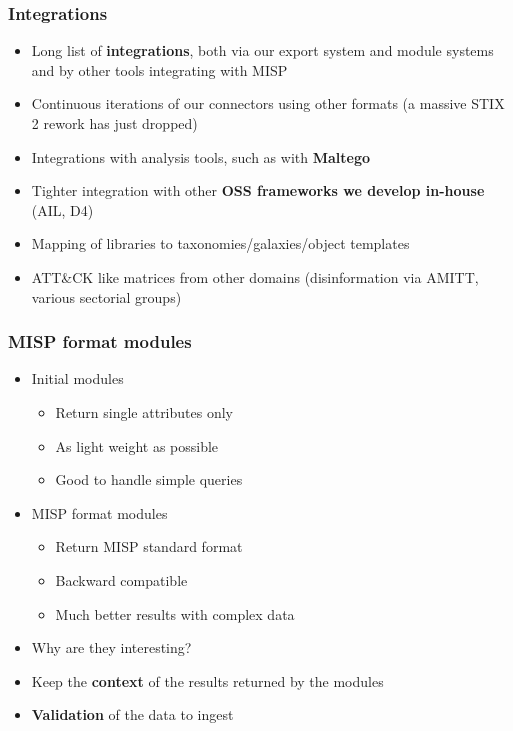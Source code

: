 \begin{frame}
\frametitle{Integrations}
\begin{itemize}
	\item Long list of {\bf integrations}, both via our export system and module systems and by other tools integrating with MISP
        \item Continuous iterations of our connectors using other formats (a massive STIX 2 rework has just dropped)
        \item Integrations with analysis tools, such as with {\bf Maltego}
        \item Tighter integration with other {\bf OSS frameworks we develop in-house} (AIL, D4)
        \item Mapping of libraries to taxonomies/galaxies/object templates
        \item ATT\&CK like matrices from other domains (disinformation via AMITT, various sectorial groups)
\end{itemize}
\end{frame}

\begin{frame}
\frametitle{MISP format modules}
\begin{itemize}
    \item Initial modules
    \begin{itemize}
        \item Return single attributes only
        \item As light weight as possible
        \item Good to handle simple queries
    \end{itemize}
    \item MISP format modules
    \begin{itemize}
        \item Return MISP standard format
        \item Backward compatible
        \item Much better results with complex data
    \end{itemize}
\end{itemize}
\pause
\begin{itemize}
    \item Why are they interesting?
    \pause
    \item Keep the {\bf context} of the results returned by the modules
    \item {\bf Validation} of the data to ingest
\end{itemize}
\end{frame}

